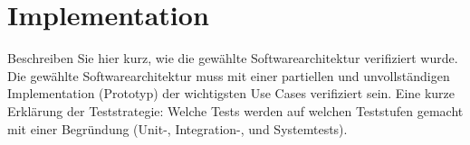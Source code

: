 \section{Implementation}
Beschreiben Sie hier kurz, wie die gewählte Softwarearchitektur verifiziert wurde. Die gewählte 
Softwarearchitektur muss mit einer partiellen und unvollständigen Implementation (Prototyp) der 
wichtigsten Use Cases verifiziert sein. 
Eine kurze Erklärung der Teststrategie: Welche Tests werden auf welchen Teststufen gemacht 
mit einer Begründung (Unit-, Integration-, und Systemtests).